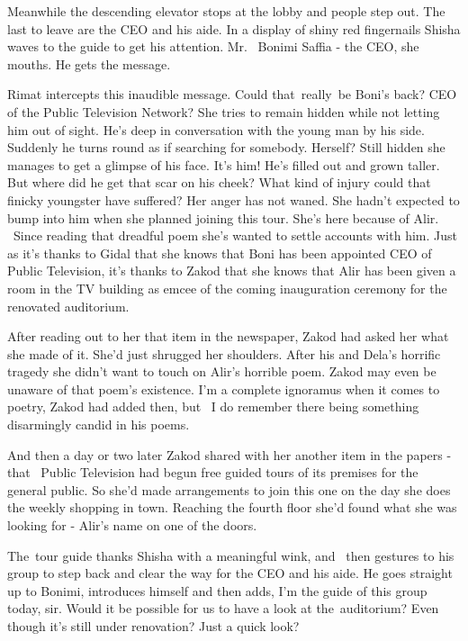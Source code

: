 \documentclass[letterpaper]{article}
\begin{document}
Meanwhile the descending elevator stops at the lobby and people step out. The last to leave are the CEO and his aide. In
a display of shiny red fingernails Shisha waves to the guide to get his attention. {\textquotedbl}Mr. ~Bonimi Saffia -
the CEO,{\textquotedbl} she mouths. He gets the message. 

Rimat intercepts this inaudible message. Could that~really~be Boni's back? CEO of the Public Television Network? She
tries to remain hidden while not letting him out of sight. He's deep in conversation with the young man by his side.
Suddenly he turns round as if searching for somebody. Herself? Still hidden she manages to get a glimpse of his face.
It's him! He's filled out and grown taller. But where did he get that scar on his cheek? What kind of injury could that
finicky youngster have suffered? Her anger has not waned. She hadn't expected to bump into him when she planned joining
this tour\textcolor[rgb]{0.8901961,0.42352942,0.039215688}{.} She's here because of Alir. \ Since reading that dreadful
poem she's wanted to settle accounts with him. Just as it's thanks to Gidal that she knows that Boni has been appointed
CEO of Public Television, it's thanks to Zakod that she knows that Alir has been given a room in the TV building as
emcee of the\textcolor[rgb]{0.8901961,0.42352942,0.039215688}{
}coming\textcolor[rgb]{0.8901961,0.42352942,0.039215688}{ }inauguration ceremony for the renovated auditorium.

After reading out to her that item in the newspaper, Zakod had asked her what she made of it. She'd just shrugged her
shoulders. After his and Dela's horrific tragedy she didn't want to touch on Alir's horrible poem. Zakod may even be
unaware of that poem's existence. {\textquotedbl}I'm a complete ignoramus when it comes to poetry,{\textquotedbl} Zakod
had added then, {\textquotedbl}but ~I do remember there being something disarmingly candid in his poems{\textquotedbl}.


And then a day or two later Zakod shared with her another item in the papers - that ~Public Television had begun free
guided tours of its premises for the general public. So she'd made arrangements to join this one on the day she does
the weekly shopping in town. Reaching the fourth floor she'd found what she was looking for - Alir's name on one of the
doors.

The~tour guide thanks Shisha with a meaningful wink, and \ then gestures to his group to step back and clear the way for
the CEO and his aide. He goes straight up to Bonimi, introduces himself and then adds, {\textquotedbl} I'm the guide of
this group today, sir. Would it be possible for us to have a look at the~auditorium? Even though it's still under
renovation? Just a quick look?{\textquotedbl} 
\end{document}
